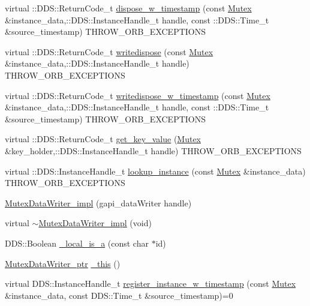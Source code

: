 \begin{DoxyCompactItemize}
virtual ::DDS::ReturnCode\_\-t \hyperlink{classKnowledge_1_1MutexDataWriter__impl_a3ec216b4ad6182560422d1c91c87fdce}{dispose\_\-w\_\-timestamp} (const \hyperlink{structKnowledge_1_1Mutex}{Mutex} \&instance\_\-data,::DDS::InstanceHandle\_\-t handle, const ::DDS::Time\_\-t \&source\_\-timestamp) THROW\_\-ORB\_\-EXCEPTIONS
\item 
virtual ::DDS::ReturnCode\_\-t \hyperlink{classKnowledge_1_1MutexDataWriter__impl_a87b6afbc7d4815b5e674cf6b425fde41}{writedispose} (const \hyperlink{structKnowledge_1_1Mutex}{Mutex} \&instance\_\-data,::DDS::InstanceHandle\_\-t handle) THROW\_\-ORB\_\-EXCEPTIONS
\item 
virtual ::DDS::ReturnCode\_\-t \hyperlink{classKnowledge_1_1MutexDataWriter__impl_a8aee2fe1ea8c774434a400e5e2c6c3d2}{writedispose\_\-w\_\-timestamp} (const \hyperlink{structKnowledge_1_1Mutex}{Mutex} \&instance\_\-data,::DDS::InstanceHandle\_\-t handle, const ::DDS::Time\_\-t \&source\_\-timestamp) THROW\_\-ORB\_\-EXCEPTIONS
\item 
virtual ::DDS::ReturnCode\_\-t \hyperlink{classKnowledge_1_1MutexDataWriter__impl_a5c3088ba1cb20b4360200929009a853a}{get\_\-key\_\-value} (\hyperlink{structKnowledge_1_1Mutex}{Mutex} \&key\_\-holder,::DDS::InstanceHandle\_\-t handle) THROW\_\-ORB\_\-EXCEPTIONS
\item 
virtual ::DDS::InstanceHandle\_\-t \hyperlink{classKnowledge_1_1MutexDataWriter__impl_a15ae4966a6b25e99eaf2c8dc78c8b7e3}{lookup\_\-instance} (const \hyperlink{structKnowledge_1_1Mutex}{Mutex} \&instance\_\-data) THROW\_\-ORB\_\-EXCEPTIONS
\item 
\hyperlink{classKnowledge_1_1MutexDataWriter__impl_a6704361655451019caa10cff1dd2de58}{MutexDataWriter\_\-impl} (gapi\_\-dataWriter handle)
\item 
virtual \hyperlink{classKnowledge_1_1MutexDataWriter__impl_aaac2297ee67a4d261eb8613debb01ff7}{$\sim$MutexDataWriter\_\-impl} (void)
\item 
DDS::Boolean \hyperlink{classKnowledge_1_1MutexDataWriter_a79756367d040d9d0963723b9364d2f9d}{\_\-local\_\-is\_\-a} (const char $\ast$id)
\item 
\hyperlink{classKnowledge_1_1MutexDataWriter}{MutexDataWriter\_\-ptr} \hyperlink{classKnowledge_1_1MutexDataWriter_aa1d4787585900fca1a5dd2945ec5e67b}{\_\-this} ()
\item 
virtual DDS::InstanceHandle\_\-t \hyperlink{classKnowledge_1_1MutexDataWriter_a0ff4ed45ede7527c3831960eeec1c59b}{register\_\-instance\_\-w\_\-timestamp} (const \hyperlink{structKnowledge_1_1Mutex}{Mutex} \&instance\_\-data, const DDS::Time\_\-t \&source\_\-timestamp)=0

\end{DoxyCompactItemize}
